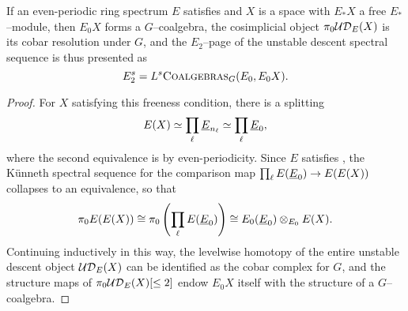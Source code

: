 \begin{lemma}\label{HopfRingFromOneRingSpectrum}
If an even-periodic ring spectrum \(E\) satisfies {\UFH} and \(X\) is a space with \(E_* X\) a free \(E_*\)--module, then \(E_0 X\) forms a \(G\)--coalgebra, the cosimplicial object \(\pi_0 \mathcal{UD}_E(X)\) is its cobar resolution under \(G\), and the \(E_2\)--page of the unstable descent spectral sequence is thus presented as \[E_2^{s} = L^s\normalfont\textsc{Coalgebras}_G(E_0, E_0 X).\]
\end{lemma}
\begin{proof}
For \(X\) satisfying this freeness condition, there is a splitting \[E(X) \simeq \prod_\ell \underline{\smash{E}}_{n_\ell} \simeq \prod_\ell \underline{\smash{E}}_{0},\] where the second equivalence is by even-periodicity.  Since \(E\) satisfies {\UFH}, the K\"unneth spectral sequence for the comparison map \(\prod_\ell E(\underline{\smash{E}}_{0}) \to E(E(X))\) collapses to an equivalence, so that \[\pi_0 E(E(X)) \cong \pi_0 \left(\prod_\ell E(\underline{\smash{E}}_{0})\right) \cong E_0(\underline{\smash{E}}_{0}) \otimes_{E_0} E(X).\]  Continuing inductively in this way, the levelwise homotopy of the entire unstable descent object \(\mathcal{UD}_E(X)\) can be identified as the cobar complex for \(G\), and the structure maps of \(\pi_0 \mathcal{UD}_E(X)[\le 2]\) endow \(E_0 X\) itself with the structure of a \(G\)--coalgebra.
\end{proof}

